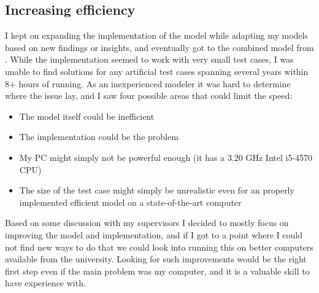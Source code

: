 \documentclass[a4paper,12pt]{article}
\begin{document}
\subsection{Increasing efficiency}
I kept on expanding the implementation of the model while adapting my models based on new findings or insights, and eventually got to the combined model from . While the implementation seemed to work with very small test cases, I was unable to find solutions for any artificial test cases spanning several years within 8+ hours of running. As an inexperienced modeler it was hard to determine where the issue lay, and I saw four possible areas that could limit the speed:

\begin{itemize}
\item The model itself could be inefficient
\item The implementation could be the problem
\item My PC might simply not be powerful enough (it has a 3.20 GHz Intel i5-4570 CPU)
\item The size of the test case might simply be unrealistic even for an properly implemented efficient model on a state-of-the-art computer
\end{itemize}

Based on some discussion with my supervisors I decided to mostly focus on improving the model and implementation, and if I got to a point where I could not find new ways to do that we could look into running this on better computers available from the university. Looking for such improvements would be the right first step even if the main problem was my computer, and it is a valuable skill to have experience with. 
\end{document}

